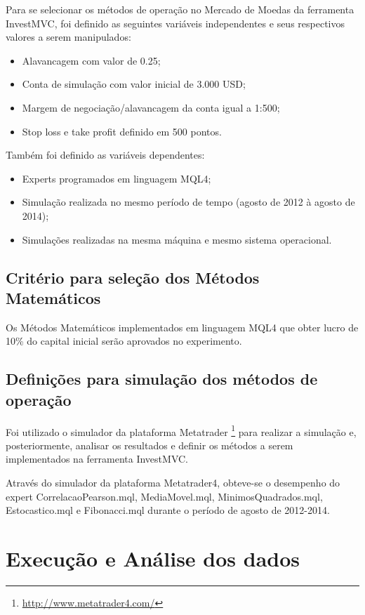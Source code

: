 Para se selecionar os métodos de operação no Mercado de Moedas da ferramenta InvestMVC, foi definido as seguintes variáveis independentes e seus respectivos valores a serem manipulados:

\begin{itemize}
\item Alavancagem com valor de 0.25;
\item Conta de simulação com valor inicial de 3.000 USD;
\item Margem de negociação/alavancagem da conta igual a 1:500;
\item Stop loss e take profit definido em 500 pontos.
\end{itemize}

Também foi definido as variáveis dependentes:

\begin{itemize}
\item Experts programados em linguagem MQL4;
\item Simulação realizada no mesmo período de tempo (agosto de 2012 à agosto de 2014);
\item Simulações realizadas na mesma máquina e mesmo sistema operacional.

\end{itemize}

\subsection{Critério para seleção dos Métodos Matemáticos}

Os Métodos Matemáticos implementados em linguagem MQL4 que obter lucro de 10\% do capital inicial serão aprovados no experimento.

\subsection{Definições para simulação dos métodos de operação}

Foi utilizado o simulador da plataforma Metatrader \footnote{\url{http://www.metatrader4.com/}} para realizar a simulação e, posteriormente, analisar os resultados e definir os métodos a serem implementados na ferramenta InvestMVC.

Através do simulador da plataforma Metatrader4, obteve-se o desempenho do expert CorrelacaoPearson.mql, MediaMovel.mql, MinimosQuadrados.mql, Estocastico.mql e Fibonacci.mql durante o período de agosto de 2012-2014.

\section{Execução e Análise dos dados}

